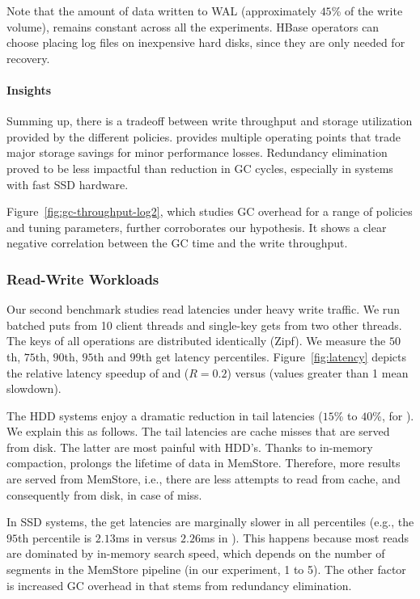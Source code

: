 Note that the amount of data written to WAL %
(approximately $45$\% of the write volume), remains constant across all the experiments. 
HBase operators can choose placing log files on inexpensive hard disks, since they are only needed for recovery.  

\paragraph{Insights} Summing up, there is a tradeoff between write throughput and storage utilization 
provided by the different \sys\/ policies. \adp\/ provides multiple operating points that trade major 
storage savings for minor performance losses. Redundancy elimination proved to be less impactful 
than reduction in GC cycles, especially in systems with fast SSD hardware. 

Figure~\ref{fig:gc-throughput-log2}, which studies GC overhead for a range of policies and tuning 
parameters, further corroborates our hypothesis. It shows a clear negative correlation between the 
GC time and the write throughput. 

\subsubsection{Read-Write Workloads}

Our second benchmark studies read latencies under heavy write traffic. 
We run batched puts from 10 client threads and single-key gets from two other threads. 
The keys of all operations are distributed identically (Zipf). We measure the $50$th, 
$75$th, $90$th, $95$th and $99$th get latency percentiles. Figure~\ref{fig:latency} 
depicts the relative latency speedup of \basic\/ and \adp\/ ($R=0.2$) versus \none\/ 
(values greater than 1 mean slowdown). 

The HDD systems enjoy a dramatic reduction in tail latencies ($15$\% to $40$\%, for \adp). 
We explain this as follows. The tail latencies are cache misses that are served from disk. 
The latter are most painful with HDD's. Thanks to in-memory compaction, \adp\/ prolongs 
the lifetime of data in MemStore. Therefore, more results are served from MemStore, i.e., 
there are less attempts to read from cache, and consequently from disk, in case of miss.  

In SSD systems, the get latencies are marginally slower in all percentiles (e.g., the 
$95$th percentile is $2.13$ms in \none\/ versus $2.26$ms in \adp). This happens
because most reads are dominated by in-memory search speed, which depends on the 
number of segments in the MemStore pipeline (in our experiment, 1 to 5). The other factor
is increased GC overhead in \adp\/ that stems from redundancy elimination. 


